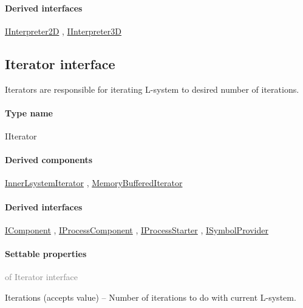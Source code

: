 	\paragraph{Derived interfaces}
		\hyperref[Malsys.Processing.Components.Interpreters.IInterpreter2D]{IInterpreter2D}%
, 		\hyperref[Malsys.Processing.Components.Interpreters.IInterpreter3D]{IInterpreter3D}%
	

\subsection{Iterator interface}
\label{Malsys.Processing.Components.IIterator}
Iterators are responsible for iterating L-system to desired number of iterations.\paragraph{Type name}
IIterator	\paragraph{Derived components}
		\hyperref[Malsys.Processing.Components.RewriterIterators.InnerLsystemIterator]{InnerLsystemIterator}%
, 		\hyperref[Malsys.Processing.Components.RewriterIterators.MemoryBufferedIterator]{MemoryBufferedIterator}%
	\paragraph{Derived interfaces}
		\hyperref[Malsys.Processing.Components.IComponent]{IComponent}%
, 		\hyperref[Malsys.Processing.Components.IProcessComponent]{IProcessComponent}%
, 		\hyperref[Malsys.Processing.Components.IProcessStarter]{IProcessStarter}%
, 		\hyperref[Malsys.Processing.Components.ISymbolProvider]{ISymbolProvider}%
	\paragraph{Settable properties}\textcolor{gray}{of Iterator interface}
	\begin{description*}
		\item[Iterations]
		(accepts value)
			-- Number of iterations to do with current L-system.
	\end{description*}
